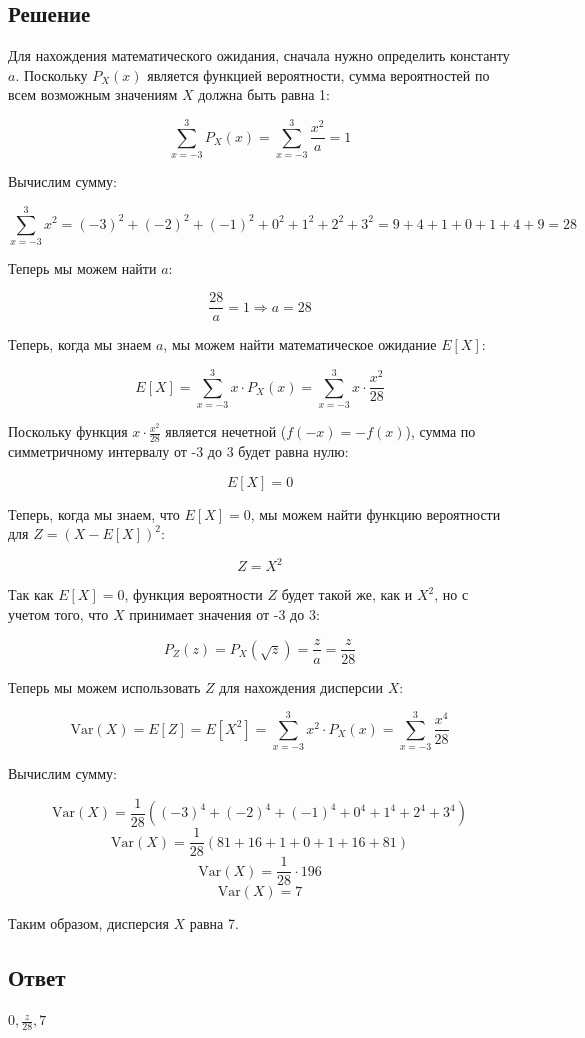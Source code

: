 \documentclass{article}
\begin{document}
\subsection*{Решение}
Для нахождения математического ожидания, сначала нужно определить константу \(a\). Поскольку \(P_X(x)\) является функцией вероятности, сумма вероятностей по всем возможным значениям \(X\) должна быть равна 1:

\[ \sum_{x=-3}^{3} P_X(x) = \sum_{x=-3}^{3} \frac{x^2}{a} = 1 \]

Вычислим сумму:

\[ \sum_{x=-3}^{3} x^2 = (-3)^2 + (-2)^2 + (-1)^2 + 0^2 + 1^2 + 2^2 + 3^2 = 9 + 4 + 1 + 0 + 1 + 4 + 9 = 28 \]

Теперь мы можем найти \(a\):

\[ \frac{28}{a} = 1 \Rightarrow a = 28 \]

Теперь, когда мы знаем \(a\), мы можем найти математическое ожидание \(E[X]\):

\[ E[X] = \sum_{x=-3}^{3} x \cdot P_X(x) = \sum_{x=-3}^{3} x \cdot \frac{x^2}{28} \]

Поскольку функция \(x \cdot \frac{x^2}{28}\) является нечетной (\(f(-x) = -f(x)\)), сумма по симметричному интервалу от -3 до 3 будет равна нулю:

\[ E[X] = 0 \]

Теперь, когда мы знаем, что \(E[X] = 0\), мы можем найти функцию вероятности для \(Z = (X - E[X])^2\):

\[ Z = X^2 \]

Так как \(E[X] = 0\), функция вероятности \(Z\) будет такой же, как и \(X^2\), но с учетом того, что \(X\) принимает значения от -3 до 3:

\[ P_Z(z) = P_X(\sqrt{z})  = \frac{z}{a} = \frac{z}{28}\]

Теперь мы можем использовать \(Z\) для нахождения дисперсии \(X\):

\[ \text{Var}(X) = E[Z] = E[X^2] = \sum_{x=-3}^{3} x^2 \cdot P_X(x) = \sum_{x=-3}^{3} \frac{x^4}{28} \]

Вычислим сумму:

\[ \text{Var}(X) = \frac{1}{28} \left((-3)^4 + (-2)^4 + (-1)^4 + 0^4 + 1^4 + 2^4 + 3^4\right) \]
\[ \text{Var}(X) = \frac{1}{28} \left(81 + 16 + 1 + 0 + 1 + 16 + 81\right) \]
\[ \text{Var}(X) = \frac{1}{28} \cdot 196 \]
\[ \text{Var}(X) = 7 \]

Таким образом, дисперсия \(X\) равна 7.
\subsection*{Ответ}
$0, \frac{z}{28}, 7$
\end{document}
